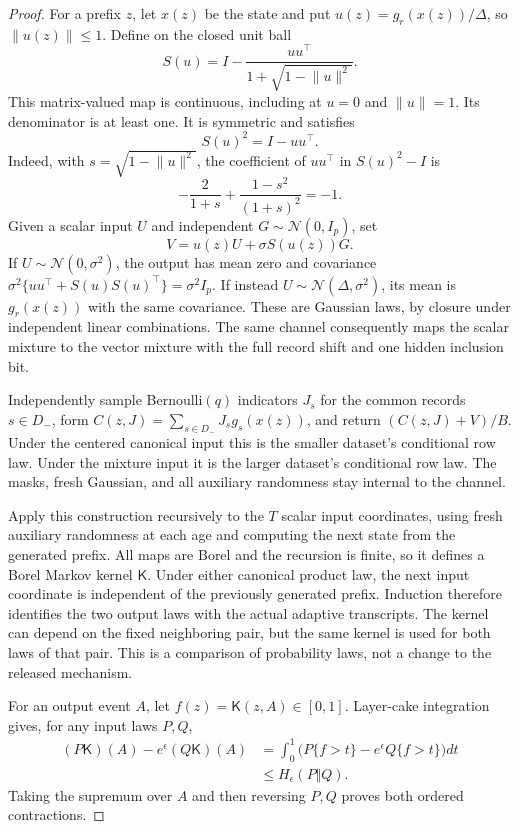 \documentclass[a4paper,11pt]{article}
\theoremstyle{remark}
\newcommand{\norm}[1]{\lVert#1\rVert}
\begin{document}
\begin{proof}
For a prefix $z$, let $x(z)$ be the state and put
$u(z)=g_r(x(z))/\Delta$, so $\norm{u(z)}\le1$. Define on the closed unit
ball
\[
 S(u)=I-\frac{uu^\top}{1+\sqrt{1-\norm u^2}}.
\]
This matrix-valued map is continuous, including at $u=0$ and $\norm u=1$.
Its denominator is at least one. It is symmetric and satisfies
\[
 S(u)^2=I-uu^\top.
\]
Indeed, with $s=\sqrt{1-\norm u^2}$, the coefficient of $uu^\top$ in
$S(u)^2-I$ is
\[
 -\frac{2}{1+s}+\frac{1-s^2}{(1+s)^2}=-1.
\]
Given a scalar input $U$ and independent $G\sim\mathcal N(0,I_p)$, set
\[
 V=u(z)U+\sigma S(u(z))G.
\]
If $U\sim\mathcal N(0,\sigma^2)$, the output has mean zero and covariance
$\sigma^2\{uu^\top+S(u)S(u)^\top\}=\sigma^2I_p$. If instead
$U\sim\mathcal N(\Delta,\sigma^2)$, its mean is $g_r(x(z))$ with the
same covariance. These are Gaussian laws, by closure under independent
linear combinations. The same channel consequently maps the scalar
mixture to the vector mixture with the full record shift and one hidden
inclusion bit.

Independently sample Bernoulli$(q)$ indicators $J_s$ for the common records
$s\in D_-$, form $C(z,J)=\sum_{s\in D_-}J_sg_s(x(z))$, and return
$(C(z,J)+V)/B$. Under the centered canonical input this is the smaller
dataset's conditional row law. Under the mixture input it is the larger
dataset's conditional row law. The masks, fresh Gaussian, and all auxiliary
randomness stay internal to the channel.

Apply this construction recursively to the $T$ scalar input coordinates,
using fresh auxiliary randomness at each age and computing the next state
from the generated prefix. All maps are Borel and the recursion is finite,
so it defines a Borel Markov kernel $\mathsf K$. Under either canonical
product law, the next input coordinate is independent of the previously
generated prefix. Induction therefore identifies the two output laws with
the actual adaptive transcripts. The kernel can depend on the fixed
neighboring pair, but the same kernel is used for both laws of that pair.
This is a comparison of probability laws, not a change to the released
mechanism.

For an output event $A$, let $f(z)=\mathsf K(z,A)\in[0,1]$.
Layer-cake integration gives, for any input laws $P,Q$,
\begin{align*}
 (P\mathsf K)(A)-e^\epsilon(Q\mathsf K)(A)
 &=\int_0^1\bigl(P\{f>t\}-e^\epsilon Q\{f>t\}\bigr)dt\\
 &\le H_\epsilon(P\Vert Q).
\end{align*}
Taking the supremum over $A$ and then reversing $P,Q$ proves both ordered
contractions.
\end{proof}
\end{document}
